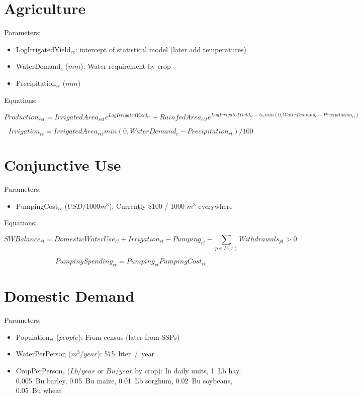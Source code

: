 \documentclass[11pt,oneside, landscape]{amsart}
\begin{document}
\section{Agriculture}

Parameters:

\begin{itemize}
\item LogIrrigatedYield$_{rc}$: intercept of statistical model (later
  add temperatures)
\item WaterDemand$_c$ ($mm$): Water requirement by crop
\item Precipitation$_{rt}$ ($mm$)
\end{itemize}

Equations:

\[
Production_{rct} = IrrigatedArea_{rct} e^{LogIrrigatedYield_{rc}} + RainfedArea_{rct}
e^{LogIrrigatedYield_{rc} - b_{rc} min(0, WaterDemand_c - Precipitation_{rt})}
\]

\[
Irrigation_{rt} = IrrigatedArea_{rct} min(0, WaterDemand_c -
Precipitation_{rt}) / 100
\]

\section{Conjunctive Use}

Parameters:

\begin{itemize}
\item PumpingCost$_{rt}$ ($USD / 1000 m^3$): Currently \$100 / 1000
  $m^3$ everywhere
\end{itemize}

Equations:

\[
SWBalance_{rt} = DomesticWaterUse_{rt} + Irrigation_{rt} -
Pumping_{rt} - \sum_{p \in P(r)} Withdrawals_{pt} > 0
\]

\[
PumpingSpending_{rt} = Pumping_{rt} PumpingCost_{rt}
\]

\section{Domestic Demand}

Parameters:

\begin{itemize}
\item Population$_{rt}$ ($people$): From census (later from SSPs)
\item WaterPerPerson ($m^3 / year$): \SI{575}{liter / year}
\item CropPerPerson$_c$ ($Lb / year$ or $Bu / year$ by crop): In daily
  units, \SI{1}{Lb} hay, \SI{.005}{Bu} barley, \SI{.05}{Bu} maize,
  \SI{.01}{Lb} sorghum, \SI{.02}{Bu} soybeans, \SI{.05}{Bu} wheat
\end{itemize}
\end{document}
